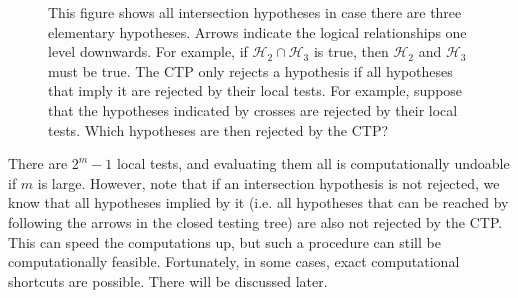 \documentclass[11pt]{article}
\theoremstyle{plain}
\theoremstyle{definition}
\newcommand{\Hy}{\mathcal{H}}
\begin{document}
\begin{figure}[h!] 
\centering

\caption{This figure shows all intersection hypotheses in case there are three elementary hypotheses. Arrows indicate the logical relationships one level downwards. For example, if $\Hy_2\cap \Hy_3$ is true, then $\Hy_2$ and $\Hy_3$ must be true. The CTP only rejects a hypothesis if all hypotheses that imply it are rejected by their local tests. For example, suppose that the hypotheses indicated by crosses are rejected by their local tests. Which hypotheses are then rejected by the CTP?}     \label{fig:ctp}
\end{figure}

There are $2^m-1$ local tests, and evaluating them all is computationally undoable if $m$ is large. However, note that if an intersection hypothesis is not rejected, we know that all hypotheses implied by it (i.e. all hypotheses that can be reached by following the arrows in the closed testing tree) are also not rejected by the CTP. This can speed the computations up, but such a procedure can still be computationally feasible. Fortunately, in some cases, exact computational shortcuts are possible. There will be discussed later.
\end{document}
